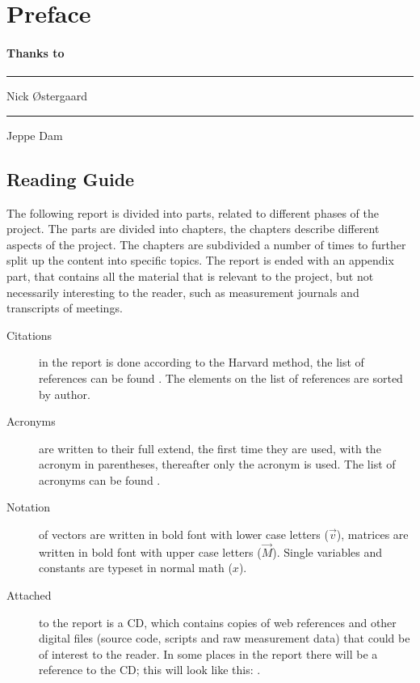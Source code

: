 \chapter{Preface}

\subsubsection*{Thanks to}


\begin{center}
  \begin{minipage}[t]{0.47\textwidth}
    \centering \vspace{1.5cm} \hrule \vspace{1mm} Nick \O stergaard
  \end{minipage}
  \hfill
  \begin{minipage}[t]{0.47\textwidth}
    \centering \vspace{1.5cm} \hrule \vspace{1mm} Jeppe Dam
  \end{minipage}
\end{center}


\newpage
\section*{Reading Guide}
The following report is divided into parts, related to different phases of the project. The parts are divided into chapters, the chapters describe different aspects of the project. The chapters are subdivided a number of times to further split up the content into specific topics. The report is ended with an appendix part, that contains all the material that is relevant to the project, but not necessarily interesting to the reader, such as measurement journals and transcripts of meetings.

\begin{description}
\item[Citations] in the report is done according to the Harvard method, the list of references can be found . The elements on the list of references are sorted by author.
\item[Acronyms] are written to their full extend, the first time they are used, with the acronym in parentheses, thereafter only the acronym is used. The list of acronyms can be found .
\item[Notation] of vectors are written in bold font with lower case letters ($\vec{v}$), matrices are written in bold font with upper case letters ($\vec{M}$). Single variables and constants are typeset in normal math ($x$).
\item[Attached] to the report is a CD, which contains copies of web references and other digital files (source code, scripts and raw measurement data) that could be of interest to the reader. In some places in the report there will be a reference to the CD; this will look like this: .
\end{description}
